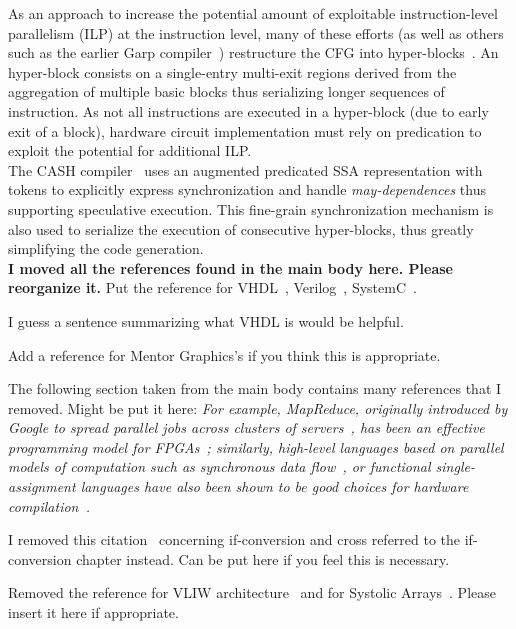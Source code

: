 As an approach to increase the potential amount of exploitable 
instruction-level parallelism (ILP) at the instruction level, 
many of these efforts (as well as others such as the earlier 
Garp compiler~\cite{Callahan:Computer00}) restructure the CFG 
into hyper-blocks~\cite{Mahlke:Micro92}. 
An hyper-block consists on a single-entry multi-exit regions derived from the 
aggregation of multiple basic blocks thus serializing longer sequences of 
instruction. As not all instructions are executed in a hyper-block (due to 
early exit of a block), hardware circuit implementation must rely on predication 
to exploit the potential for additional ILP. \\

The CASH compiler~\cite{Budiu:FPL02} uses an augmented predicated SSA
representation with tokens to explicitly express synchronization and handle 
{\em may-dependences} thus supporting speculative  execution. 
This fine-grain synchronization mechanism is also used to serialize 
the execution of consecutive hyper-blocks, thus greatly simplifying 
the code generation.\\

{\bf I moved all the references found in the main body here. Please reorganize it.}
Put the reference for VHDL~\cite{VHDLBook}, Verilog~\cite{VerilogBook}, SystemC~\cite{SystemC:ISSS01}.

I guess a sentence summarizing what VHDL is would be helpful.

Add a reference for Mentor Graphics's if you think this is appropriate.

The following section taken from the main body contains many references that I removed. Might be put it here: {\em 
For example, MapReduce, originally introduced by Google to spread parallel 
jobs across clusters of servers~\cite{Dean:CACM08}, has been an effective 
programming model for FPGAs~\cite{Yeung:FCCM08}; similarly, high-level 
languages based on parallel models of computation such as synchronous data 
flow~\cite{Lee:ProcIEEE87}, or functional single-assignment languages have 
also been shown to be good choices for hardware 
compilation~\cite{Hormati:CASES08,Hagiescu:DAC09,SAC:IJS02}.}

I removed this citation~\cite{Allen:POPL83} concerning if-conversion and cross referred to the if-conversion chapter instead. Can be put here if you feel this is necessary.

Removed the reference for VLIW architecture~\cite{Fisher:2005:Book} and for Systolic Arrays~\cite{CompilingSystolicArraysBook}. Please insert it here if appropriate.

